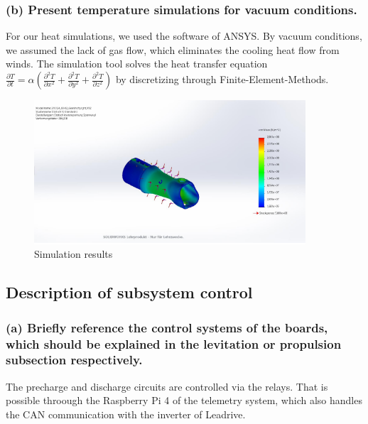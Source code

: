 \subsubsection{(b) Present temperature simulations for vacuum conditions.}
For our heat simulations, we used the software of ANSYS. By vacuum conditions, we assumed the
lack of gas flow, which eliminates the cooling heat flow from winds. The simulation tool solves
the heat transfer equation \( \frac{\partial T}{\partial t} = \alpha \left( \frac{\partial^2 T}{\partial x^2} + \frac{\partial^2 T}{\partial y^2} + \frac{\partial^2 T}{\partial z^2} \right) \)
by discretizing through Finite-Element-Methods.
\begin{figure}[H]
    \centering
    \includegraphics[width=0.9\textwidth]{texfiles/elec/eimg/SimulationTemplate}
    \caption{Simulation results}
    \label{img: simresults_battery}
\end{figure}


\subsection{Description of subsystem control}
\subsubsection{(a) Briefly reference the control systems of the boards, which should be explained in the levitation or propulsion subsection respectively.}
The precharge and discharge circuits are controlled via the relays. That is possible throough the Raspberry Pi 4 of the telemetry system, which also handles the CAN communication with the inverter of Leadrive.


